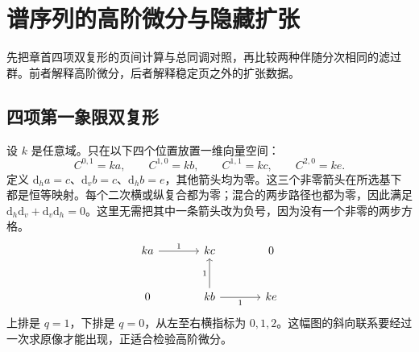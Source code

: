 
\section{谱序列的高阶微分与隐藏扩张}
\label{b4:sec:1405}

先把章首四项双复形的页间计算与总同调对照，再比较两种伴随分次相同的滤过群。前者解释高阶微分，后者解释稳定页之外的扩张数据。

%
%
%

\subsection{四项第一象限双复形}
\label{b4:subsec:1405:01}

设 \(k\) 是任意域。只在以下四个位置放置一维向量空间：
\[
	C^{0,1}=ka,\qquad C^{1,0}=kb,\qquad C^{1,1}=kc,\qquad C^{2,0}=ke.
\]
定义 \(\mathrm{d}_ha=c\)、\(\mathrm{d}_vb=c\)、\(\mathrm{d}_hb=e\)，其他箭头均为零。这三个非零箭头在所选基下都是恒等映射。每个二次横或纵复合都为零；混合的两步路径也都为零，因此满足 \(\mathrm{d}_h\mathrm{d}_v+\mathrm{d}_v\mathrm{d}_h=0\)。这里无需把其中一条箭头改为负号，因为没有一个非零的两步方格。
\[
	\begin{tikzcd}[column sep=large,row sep=large]
		ka \arrow[r,"1"] & kc & 0\\
		0 & kb \arrow[u,"1"] \arrow[r,"1"'] & ke
	\end{tikzcd}
\]
上排是 \(q=1\)，下排是 \(q=0\)，从左至右横指标为 \(0,1,2\)。这幅图的斜向联系要经过一次求原像才能出现，正适合检验高阶微分。

